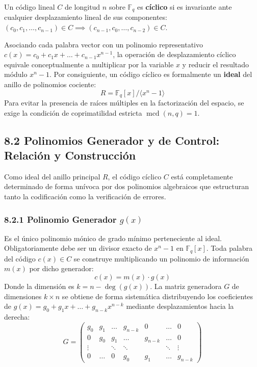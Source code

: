 \documentclass{article}
\begin{document}
Un código lineal $C$ de longitud $n$ sobre $\mathbb{F}_q$ es \textbf{cíclico} si es invariante ante cualquier desplazamiento lineal de sus componentes: $(c_0, c_1, \dots, c_{n-1}) \in C \implies (c_{n-1}, c_0, \dots, c_{n-2}) \in C$.

Asociando cada palabra vector con un polinomio representativo $c(x) = c_0 + c_1x + \dots + c_{n-1}x^{n-1}$, la operación de desplazamiento cíclico equivale conceptualmente a multiplicar por la variable $x$ y reducir el resultado módulo $x^n - 1$. Por consiguiente, un código cíclico es formalmente un \textbf{ideal} del anillo de polinomios cociente:
\[
R = \mathbb{F}_q[x] / \langle x^n - 1 \rangle
\]
Para evitar la presencia de raíces múltiples en la factorización del espacio, se exige la condición de coprimatilidad estricta $\operatorname{mcd}(n, q) = 1$.

\subsection{8.2 Polinomios Generador y de Control: Relación y Construcción}

Como ideal del anillo principal $R$, el código cíclico $C$ está completamente determinado de forma unívoca por dos polinomios algebraicos que estructuran tanto la codificación como la verificación de errores.

\subsubsection{8.2.1 Polinomio Generador $g(x)$}
Es el único polinomio mónico de grado mínimo perteneciente al ideal. Obligatoriamente debe ser un divisor exacto de $x^n - 1$ en $\mathbb{F}_q[x]$. Toda palabra del código $c(x) \in C$ se construye multiplicando un polinomio de información $m(x)$ por dicho generador:
\[
c(x) = m(x) \cdot g(x)
\]
Donde la dimensión es $k = n - \operatorname{deg}(g(x))$. La matriz generadora $G$ de dimensiones $k \times n$ se obtiene de forma sistemática distribuyendo los coeficientes de $g(x) = g_0 + g_1x + \dots + g_{n-k}x^{n-k}$ mediante desplazamientos hacia la derecha:
\[
G = \begin{pmatrix}
g_0 & g_1 & \dots & g_{n-k} & 0 & \dots & 0 \\
0 & g_0 & g_1 & \dots & g_{n-k} & \dots & 0 \\
\vdots & & \ddots & \ddots & & \ddots & \vdots \\
0 & \dots & 0 & g_0 & g_1 & \dots & g_{n-k}
\end{pmatrix}
\]
\end{document}
